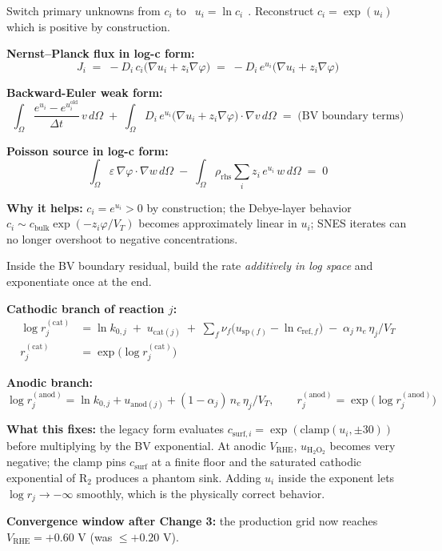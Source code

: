 \documentclass[11pt]{article}
\newcommand{\VT}{V_{T}}
\newcommand{\VRHE}{V_{\mathrm{RHE}}}
\begin{document}
\begin{tcolorbox}[cardstyle={Change 2: log-concentration formulation}]
Switch primary unknowns from \(c_i\) to
\(\;\boxed{\,u_i = \ln c_i\,}\;\). Reconstruct \(c_i = \exp(u_i)\)
which is positive by construction.

\textbf{Nernst--Planck flux in log-c form:}
\[
  J_i \;=\; -D_i\,c_i\bigl(\nabla u_i + z_i\nabla\varphi\bigr)
  \;=\; -D_i\,e^{u_i}\bigl(\nabla u_i + z_i\nabla\varphi\bigr)
\]

\textbf{Backward-Euler weak form:}
\[
  \int_\Omega \frac{e^{u_i} - e^{u_i^{\mathrm{old}}}}{\Delta t}\,v\,d\Omega
  \;+\;
  \int_\Omega D_i\,e^{u_i}\bigl(\nabla u_i + z_i\nabla\varphi\bigr)\!\cdot\!\nabla v\,d\Omega
  \;=\; \text{(BV boundary terms)}
\]

\textbf{Poisson source in log-c form:}
\[
  \int_\Omega \varepsilon\,\nabla\varphi\!\cdot\!\nabla w\,d\Omega
  \;-\;\int_\Omega \rho_{\mathrm{rhs}}\!\sum_{i} z_i\,e^{u_i}\,w\,d\Omega
  \;=\; 0
\]

\textbf{Why it helps:} \(c_i = e^{u_i} > 0\) by construction; the
Debye-layer behavior \(c_i \sim c_{\mathrm{bulk}}\exp(-z_i\varphi/\VT)\)
becomes approximately linear in \(u_i\); SNES iterates can no longer
overshoot to negative concentrations.
\end{tcolorbox}

\begin{tcolorbox}[cardstyle={Change 3: log-rate Butler--Volmer}]
Inside the BV boundary residual, build the rate \emph{additively in
log space} and exponentiate once at the end.

\textbf{Cathodic branch of reaction $j$:}
\begin{align*}
  \log r_j^{(\text{cat})}
   &= \ln k_{0,j} \;+\; u_{\mathrm{cat}(j)}
      \;+\; \sum_{f}\nu_f\bigl(u_{\mathrm{sp}(f)} - \ln c_{\mathrm{ref},f}\bigr)
      \;-\;\alpha_j\,n_e\,\eta_j/\VT \\[2pt]
  r_j^{(\text{cat})} &= \exp\!\bigl(\log r_j^{(\text{cat})}\bigr)
\end{align*}

\textbf{Anodic branch:}
\[
  \log r_j^{(\text{anod})}
   = \ln k_{0,j} + u_{\mathrm{anod}(j)}
     + (1-\alpha_j)\,n_e\,\eta_j/\VT,\qquad
  r_j^{(\text{anod})} = \exp\!\bigl(\log r_j^{(\text{anod})}\bigr)
\]

\textbf{What this fixes:} the legacy form evaluates
\(c_{\mathrm{surf},i}=\exp(\mathrm{clamp}(u_i,\pm 30))\) before
multiplying by the BV exponential. At anodic \(\VRHE\), \(u_{\mathrm{H_2O_2}}\)
becomes very negative; the clamp pins \(c_{\mathrm{surf}}\) at a
finite floor and the saturated cathodic exponential of \(\mathrm{R_2}\)
produces a phantom sink. Adding \(u_i\) inside the exponent lets
\(\log r_j \to -\infty\) smoothly, which is the physically correct
behavior.

\textbf{Convergence window after Change 3:} the production grid now
reaches \(\VRHE = +0.60\) V (was \(\le +0.20\) V).
\end{tcolorbox}
\end{document}
